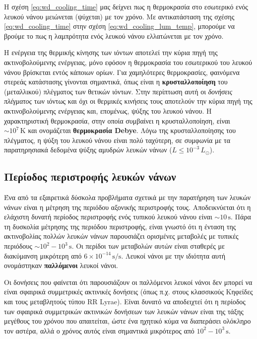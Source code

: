 Η σχέση \eqref{eq:wd_cooling_time} μας δείχνει πως η θερμοκρασία στο εσωτερικό ενός λευκού νάνου μειώνεται (ψύχεται) με τον χρόνο. Με αντικατάσταση της σχέσης \eqref{eq:wd_cooling_time} στην σχέση \eqref{eq:wd_cooling_lum_temp}, μπορούμε να βρούμε το πως η λαμπρότητα ενός λευκού νάνου ελλατώνεται με τον χρόνο.

Η ενέργεια της θερμικής κίνησης των ιόντων αποτελεί την κύρια πηγή της ακτινοβολούμενης ενέργειας, μόνο εφόσον η θερμοκρασία του εσωτερικού του λευκού νάνου βρίσκεται εντός κάποιων ορίων. Για χαμηλότερες θερμοκρασίες, φαινόμενα στερεάς κατάστασης γίνονται σημαντικά, όπως είναι η \textbf{κρυσταλλοποίηση} του (μεταλλικού) πλέγματος των θετικών ιόντων. Στην περίπτωση αυτή οι \textit{δονήσεις πλέγματος} των ιόντως και όχι οι θερμικές κινήσεις τους αποτελούν την κύρια πηγή της ακτινοβολούμενης ενέργειας και, επομένως, ψύξης του λευκού νάνου. Η χαρακτηριστική θερμοκρασία, στην οποία συμβαίνει η κρυσταλλοποίηση, είναι $\sim 10^7\,\text{K}$ και ονομάζεται \textbf{θερμοκρασία Debye}. Λόγω της κρυσταλλοποίησης του πλέγματος, η ψύξη του λευκού νάνου είναι πολύ ταχύτερη, σε συμφωνία με τα παρατηρησιακά δεδομένα ψύξης αμυδρών λευκών νάνων ($L \leq 10^{-3}\,L_\odot$). 

\subsection{Περίοδος περιστροφής λευκών νάνων}
Ένα από τα εξαιρετικά δύσκολα προβλήματα σχετικά με την παρατήρηση των λευκών νάνων είναι η μέτρηση της περιόδου αξονικής περιστροφής τους. Αποδεικνύεται ότι η ελάχιστη δυνατή περίοδος περιστροφής ενός τυπικού λευκού νάνου είναι $\sim 10\,\text{s}$. Πάρα τη δυσκολία μέτρησης της περιόδου περιστροφής, είναι γνωστό ότι η ένταση της ακτινοβολίας πολλών λευκών νάνων παρουσιάζει ορισμένες μεταβολές με τυπικές περιόδους $\sim 10^2 - 10^3\,\text{s}$. Οι περίδοι των μεταβολών αυτών είναι σταθερές με διακύμανση μικρότερη από $6 \times 10^{-14}\,\text{s/s}$. Λευκοί νάνοι με την ιδιότητα αυτή ονομάστηκαν \textbf{παλλόμενοι} λευκοί νάνοι.

Οι δονήσεις που φαίνεται ότι παρουσιάζουν οι παλλόμενοι λευκοί νάνοι δεν μπορεί να είναι σφαιρικά συμμετρικές ακτινικές δονήσεις (όπως π.χ. στους κλασσικούς Κηφείδες και τους μεταβλητούς τύπου RR Lyrae). Είναι δυνατό να αποδειχτεί ότι η περίοδος των σφαιρικά συμμετρικών ακτινικών δονήσεων των λευκών νάνων είναι της τάξης μεγέθους του χρόνου που απαιτείται, ώστε ένα ηχητικό κύμα να διαπεράσει ολόκληρο τον αστέρα, αλλά ο χρόνος αυτός είναι σημαντικά μικρότερος από $10^2 - 10^3\,\text{s}$. 


